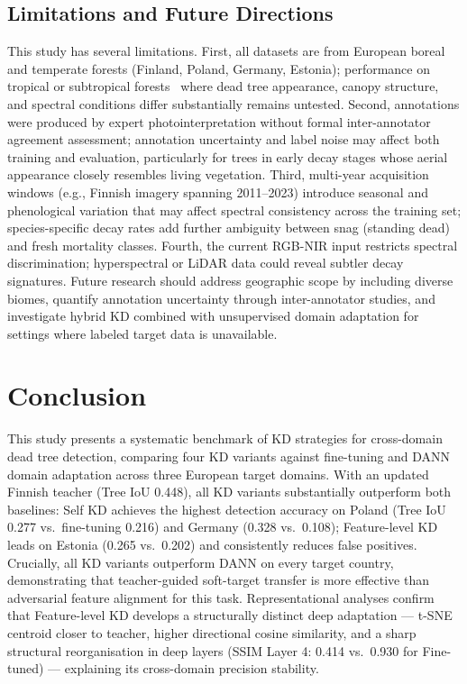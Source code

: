 \documentclass[twocolumn]{article}
\begin{document}
\subsection{Limitations and Future Directions}
This study has several limitations. First, all datasets are from European boreal and temperate forests (Finland, Poland, Germany, Estonia); performance on tropical or subtropical forests~\citep{cheng2024scattered} where dead tree appearance, canopy structure, and spectral conditions differ substantially remains untested. Second, annotations were produced by expert photointerpretation without formal inter-annotator agreement assessment; annotation uncertainty and label noise may affect both training and evaluation, particularly for trees in early decay stages whose aerial appearance closely resembles living vegetation. Third, multi-year acquisition windows (e.g., Finnish imagery spanning 2011--2023) introduce seasonal and phenological variation that may affect spectral consistency across the training set; species-specific decay rates add further ambiguity between snag (standing dead) and fresh mortality classes. Fourth, the current RGB-NIR input restricts spectral discrimination; hyperspectral or LiDAR data could reveal subtler decay signatures. Future research should address geographic scope by including diverse biomes, quantify annotation uncertainty through inter-annotator studies, and investigate hybrid KD combined with unsupervised domain adaptation for settings where labeled target data is unavailable.

\section{Conclusion}
\label{sec:conclusion}

This study presents a systematic benchmark of KD strategies for cross-domain dead tree detection, comparing four KD variants against fine-tuning and DANN domain adaptation across three European target domains. With an updated Finnish teacher (Tree IoU 0.448), all KD variants substantially outperform both baselines: Self KD achieves the highest detection accuracy on Poland (Tree IoU 0.277 vs.\ fine-tuning 0.216) and Germany (0.328 vs.\ 0.108); Feature-level KD leads on Estonia (0.265 vs.\ 0.202) and consistently reduces false positives. Crucially, all KD variants outperform DANN on every target country, demonstrating that teacher-guided soft-target transfer is more effective than adversarial feature alignment for this task. Representational analyses confirm that Feature-level KD develops a structurally distinct deep adaptation --- t-SNE centroid closer to teacher, higher directional cosine similarity, and a sharp structural reorganisation in deep layers (SSIM Layer 4: 0.414 vs.\ 0.930 for Fine-tuned) --- explaining its cross-domain precision stability.
\end{document}
